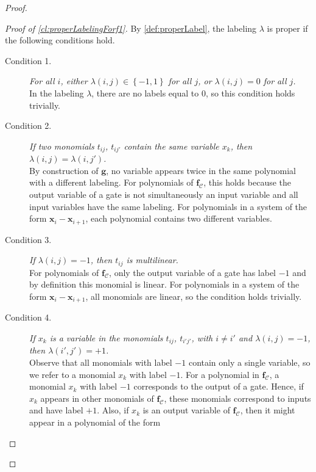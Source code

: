 \documentclass[10pt,a4paper]{article}
\theoremstyle{definition}
\theoremstyle{remark}
\def\set#1{\left\{#1\right\}}
\newcommand{\calC}{\mathcal{C}}
\newcommand{\vecf}{\ensuremath{\boldsymbol{f}}}
\newcommand{\vecg}{\ensuremath{\boldsymbol{g}}}
\newcommand{\vecx}{\ensuremath{\boldsymbol{x}}}
\begin{document}
\begin{proof}
\begin{proof}[Proof of \autoref{cl:properLabelingForf1}]
        By \autoref{def:properLabel}, the labeling $\lambda$ is proper if the following conditions hold.
      \begin{description}
        \item[Condition 1.] \emph{For all $i$, either $\lambda(i, j) \in \set{-1, 1}$ for all $j$, or $\lambda(i, j) = 0$ for all $j$.} \\
              In the labeling $\lambda$, there are no labels equal to
              $0$, so this condition holds trivially.
        \item[Condition 2.] \emph{If two monomials $t_{i j}$, $t_{i j'}$ contain the same
              variable $x_k$, then $\lambda(i, j) = \lambda(i, j')$.}\\
              By construction of $\vecg$, no variable appears twice in the same
              polynomial with a different labeling. For polynomials of
              $\vecf_{\calC}$, this holds because the output variable of a gate is
              not simultaneously an input variable and all
              input variables have the same labeling. For polynomials in a system of
              the form $\vecx_i - \vecx_{i+1}$, each polynomial contains two different
              variables.
        \item[Condition 3.] \emph{If $\lambda(i, j) = -1$, then $t_{i j}$ is multilinear.} \\
              For polynomials of $\vecf_{\calC}$, only the output variable of a
              gate has label $-1$ and by definition this monomial is linear. For
              polynomials in a system of the form $\vecx_i - \vecx_{i+1}$, all monomials
              are linear, so the condition holds trivially.
        \item[Condition 4.] \emph{If $x_k$ is a variable in the monomials $t_{i j}$,
              $t_{i' j'}$,
              with $i \neq i'$ and $\lambda(i, j) = -1$, then $\lambda(i', j') = +1$.} \\
              Observe that all monomials with label $-1$ contain only a single
              variable, so we refer to a monomial $x_k$ with label $-1$.
              For a polynomial in $\vecf_{\calC}$, a monomial $x_k$ with label $-1$
              corresponds to the output of a gate. Hence, if $x_k$ appears in other
              monomials of $\vecf_{\calC}$, these monomials correspond to inputs
              and have label $+1$. Also, if $x_k$ is an output variable of
              $\vecf_{\calC}$, then it might appear in a polynomial of the form

\end{description}
\end{proof}
\end{proof}
\end{document}
